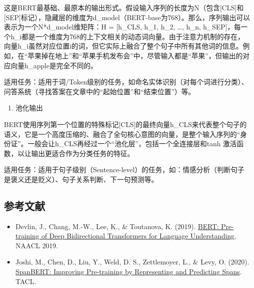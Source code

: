 这是BERT最基础、最原本的输出形式。假设输入序列的长度为N（包含{[}CLS{]}和{[}SEP{]}标记），隐藏层的维度为d\_model（BERT-base为768）。那么，序列输出可以表示为一个N*d\_model维矩阵：H = {[}h\_CLS, h\_1, h\_2, \ldots, h\_n, h\_SEP{]}，每一个h\_i都是一个维度为768的上下文相关的动态词向量。由于注意力机制的存在，向量h\_i虽然对应位置i的词，但它实际上融合了整个句子中所有其他词的信息。例如，在``苹果掉在地上''和``苹果手机发布会''中，尽管输入都是``苹果''，但输出的对应向量h\_apple是完全不同的。

适用任务：适用于词/Token级别的任务，如命名实体识别（对每个词进行分类）、问答系统（寻找答案在文章中的``起始位置''和``结束位置''）等。

\begin{enumerate}
\def\labelenumi{\arabic{enumi}.}
\setcounter{enumi}{1}
\tightlist
\item
  池化输出
\end{enumerate}

BERT使用序列第一个位置的特殊标记{[}CLS{]}的最终向量h\_CLS来代表整个句子的语义，它是一个高度压缩的、融合了全句核心意图的向量，是整个输入序列的``身份证''。一般会让h\_CLS再经过一个``池化层''，包括一个全连接层和tanh 激活函数，以让输出更适合作为分类任务的特征。

适用任务：适用于句子级别（Sentence-level）的任务，如：情感分析（判断句子是褒义还是贬义）、句子关系判断、下一句预测等。

\FloatBarrier
{}
\hypertarget{ux53c2ux8003ux6587ux732e-71}{%
\subsection{参考文献}\label{ux53c2ux8003ux6587ux732e-71}}

\vspace{0.25em}
\begin{itemize}
\tightlist
\item
  Devlin, J., Chang, M.-W., Lee, K., \& Toutanova, K. (2019). \href{https://arxiv.org/abs/1810.04805}{BERT: Pre-training of Deep Bidirectional Transformers for Language Understanding}. NAACL 2019.
\item
  Joshi, M., Chen, D., Liu, Y., Weld, D. S., Zettlemoyer, L., \& Levy, O. (2020). \href{https://arxiv.org/abs/1907.10529}{SpanBERT: Improving Pre-training by Representing and Predicting Spans}. TACL.
\end{itemize}

\clearpage
